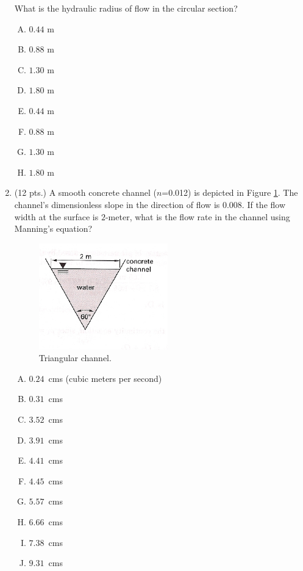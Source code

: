 \documentclass[11pt]{article}
\begin{document}
\begin{enumerate}
What is the hydraulic radius of flow in the circular section?
\begin{enumerate} [(A)]
\item $0.44$ m
\item $0.88$ m
\item $1.30$ m
\item $1.80$ m
\item $0.44$ m
\item $0.88$ m
\item $1.30$ m
\item $1.80$ m
\end{enumerate}

\clearpage
\item (12 pts.)
A smooth concrete channel ($n$=0.012) is depicted in Figure \ref{fig:TriangleChannel}.  
The channel's dimensionless slope in the direction of flow is $0.008$.  
If the flow width at the surface is $2$-meter, what is the flow rate in the channel using Manning's equation?

\begin{figure}[h!] %
\centering
   \includegraphics[width=2.2in]{TriangleChannel.jpg}
   \caption{Triangular channel.}
   \label{fig:TriangleChannel} 
\end{figure}

\begin{enumerate} [(A)]
\item $0.24$~cms (cubic meters per second)
\item $0.31$~cms 
\item $3.52$~cms 
\item $3.91$~cms 
\item $4.41$~cms 
\item $4.45$~cms 
\item $5.57$~cms 
\item $6.66$~cms 
\item $7.38$~cms 
\item $9.31$~cms 
\end{enumerate}


\end{enumerate}
\end{document}
